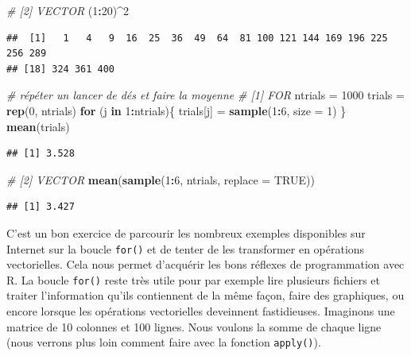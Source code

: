 \documentclass[]{book}
\newenvironment{Shaded}{\begin{snugshade}}{\end{snugshade}}
\newcommand{\CommentTok}[1]{\textcolor[rgb]{0.56,0.35,0.01}{\textit{#1}}}
\newcommand{\ControlFlowTok}[1]{\textcolor[rgb]{0.13,0.29,0.53}{\textbf{#1}}}
\newcommand{\DataTypeTok}[1]{\textcolor[rgb]{0.13,0.29,0.53}{#1}}
\newcommand{\DecValTok}[1]{\textcolor[rgb]{0.00,0.00,0.81}{#1}}
\newcommand{\KeywordTok}[1]{\textcolor[rgb]{0.13,0.29,0.53}{\textbf{#1}}}
\newcommand{\NormalTok}[1]{#1}
\newcommand{\OperatorTok}[1]{\textcolor[rgb]{0.81,0.36,0.00}{\textbf{#1}}}
\newcommand{\OtherTok}[1]{\textcolor[rgb]{0.56,0.35,0.01}{#1}}
\newcommand{\StringTok}[1]{\textcolor[rgb]{0.31,0.60,0.02}{#1}}
\begin{document}
\begin{Shaded}
\begin{Highlighting}[]
\CommentTok{# [2] VECTOR}
\NormalTok{(}\DecValTok{1}\OperatorTok{:}\DecValTok{20}\NormalTok{)}\OperatorTok{^}\DecValTok{2}
\end{Highlighting}
\end{Shaded}

\begin{verbatim}
##  [1]   1   4   9  16  25  36  49  64  81 100 121 144 169 196 225 256 289
## [18] 324 361 400
\end{verbatim}

\begin{Shaded}
\begin{Highlighting}[]
\CommentTok{# répéter un lancer de dés et faire la moyenne}
\CommentTok{# [1] FOR}
\NormalTok{ntrials =}\StringTok{ }\DecValTok{1000}
\NormalTok{trials =}\StringTok{ }\KeywordTok{rep}\NormalTok{(}\DecValTok{0}\NormalTok{, ntrials)}
\ControlFlowTok{for}\NormalTok{ (j }\ControlFlowTok{in} \DecValTok{1}\OperatorTok{:}\NormalTok{ntrials)\{}
\NormalTok{  trials[j] =}\StringTok{ }\KeywordTok{sample}\NormalTok{(}\DecValTok{1}\OperatorTok{:}\DecValTok{6}\NormalTok{, }\DataTypeTok{size =} \DecValTok{1}\NormalTok{)}
\NormalTok{\}}
\KeywordTok{mean}\NormalTok{(trials)}
\end{Highlighting}
\end{Shaded}

\begin{verbatim}
## [1] 3.528
\end{verbatim}

\begin{Shaded}
\begin{Highlighting}[]
\CommentTok{# [2] VECTOR}
\KeywordTok{mean}\NormalTok{(}\KeywordTok{sample}\NormalTok{(}\DecValTok{1}\OperatorTok{:}\DecValTok{6}\NormalTok{, ntrials, }\DataTypeTok{replace =} \OtherTok{TRUE}\NormalTok{))}
\end{Highlighting}
\end{Shaded}

\begin{verbatim}
## [1] 3.427
\end{verbatim}

C'est un bon exercice de parcourir les nombreux exemples disponibles sur Internet sur la boucle \texttt{for()} et de tenter de les transformer en opérations vectorielles. Cela nous permet d'acquérir les bons réflexes de programmation avec R. La boucle \texttt{for()} reste très utile pour par exemple lire plusieurs fichiers et traiter l'information qu'ils contiennent de la même façon, faire des graphiques, ou encore lorsque les opérations vectorielles deveinnent fastidieuses. Imaginons une matrice de 10 colonnes et 100 lignes. Nous voulons la somme de chaque ligne (nous verrons plus loin comment faire avec la fonction \texttt{apply()}).
\end{document}
